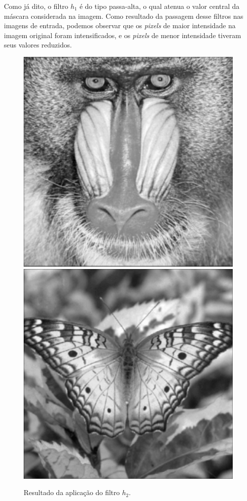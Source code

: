 \documentclass[twoside,twocolumn]{article}
\begin{document}
Como já dito, o filtro $h_{1}$ é do tipo passa-alta, o qual atenua o valor central da máscara considerada na imagem. Como resultado da passagem desse filtros nas imagens de entrada, podemos observar que os \textit{pixels} de maior intensidade na imagem original foram intensificados, e os \textit{pixels} de menor intensidade tiveram seus valores reduzidos.

\begin{figure}[H]
\begin{center}
	\includegraphics[scale=.19]{figures/baboon_h2.png}
	\includegraphics[scale=.19]{figures/butterfly_h2.png}
\caption{Resultado da aplicação do filtro $h_{2}$.} \label{gdimotes}
\end{center}
\end{figure}
\end{document}
